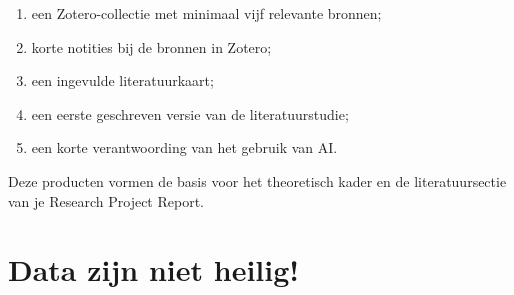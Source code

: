 \documentclass[
  letterpaper,
  DIV=11,
  numbers=noendperiod]{scrreprt}
\providecommand{\tightlist}{%
  \setlength{\itemsep}{0pt}\setlength{\parskip}{0pt}}
\begin{document}
\begin{enumerate}
\def\labelenumi{\arabic{enumi}.}
\tightlist
\item
  een Zotero-collectie met minimaal vijf relevante bronnen;
\item
  korte notities bij de bronnen in Zotero;
\item
  een ingevulde literatuurkaart;
\item
  een eerste geschreven versie van de literatuurstudie;
\item
  een korte verantwoording van het gebruik van AI.
\end{enumerate}

Deze producten vormen de basis voor het theoretisch kader en de
literatuursectie van je Research Project Report.


\chapter{Data zijn niet heilig!}\label{sec-mt3}
\end{document}
